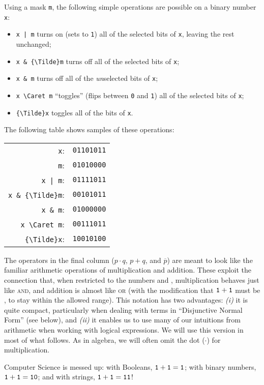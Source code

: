 Using a mask \verb|m|, the following simple operations are possible on a binary number \verb|x|:
\begin{itemize}
\item \verb-x | m- turns on (sets to \verb|1|) all of the selected bits of \verb|x|, leaving the rest unchanged;
\item \Verb|x & {\Tilde}m| turns off all of the selected bits of \verb|x|;
\item \verb|x & m| turns off all of the \emph{un}selected bits of \verb|x|;
\item \Verb|x \Caret m| ``toggles'' (flips between \verb|0| and \verb|1|) all of the selected bits of \verb|x|;
\item \Verb|{\Tilde}x| toggles all of the bits of \verb|x|.
\end{itemize}
The following table shows samples of these operations:
\begin{center}\begin{tabular}{rl}
\verb|x|:             & \verb|01101011|\\
\verb|m|:             & \verb|01010000|\\ \hline
\verb-x | m-:         & \verb|01111011|\\
\Verb|x & {\Tilde}m|: & \verb|00101011|\\
\verb|x & m|:         & \verb|01000000|\\
\Verb|x \Caret m|:    & \verb|00111011|\\
\Verb|{\Tilde}x|:     & \verb|10010100|
\end{tabular}\end{center}

The operators in the final column ($p\cdot q$, $p+q$, and $\overline{p}$) are meant to look like the familiar arithmetic operations of multiplication and addition. These exploit the connection that, when restricted to the numbers \0 and \1, multiplication behaves just like \textsc{and}, and addition is almost like \textsc{or} (with the modification that $\mathtt{1} + \mathtt{1}$ must be \1, to stay within the allowed range). This notation has two advantages: \textit{(i)} it is quite compact, particularly when dealing with terms in ``Disjunctive Normal Form'' (see below), and \textit{(ii)} it enables us to use many of our intuitions from arithmetic when working with logical expressions. We will use this version in most of what follows. As in algebra, we will often omit the dot ($\cdot$) for multiplication.

\begin{tailquote}
Computer Science is messed up: with Booleans, $\mathtt{1}+\mathtt{1}=\mathtt{1}$; with binary numbers, $\mathtt{1}+\mathtt{1}=\mathtt{1}\mathtt{0}$; and with strings, $\mathtt{1}+\mathtt{1}=\mathtt{1}\mathtt{1}$!
\end{tailquote}

